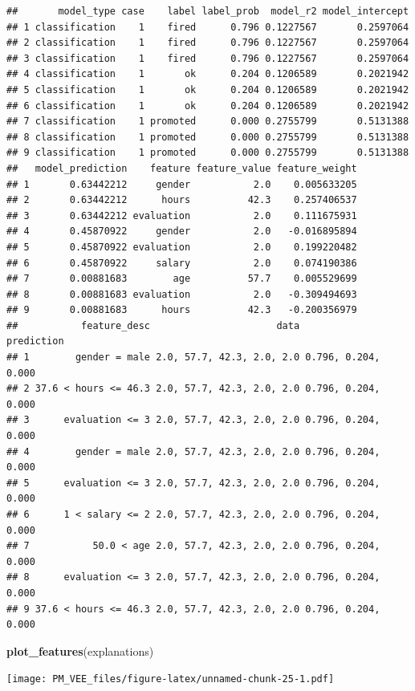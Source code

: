 \documentclass[]{krantz}
\newenvironment{Shaded}{\begin{snugshade}}{\end{snugshade}}
\newcommand{\KeywordTok}[1]{\textcolor[rgb]{0.13,0.29,0.53}{\textbf{#1}}}
\newcommand{\NormalTok}[1]{#1}
\theoremstyle{definition}
\theoremstyle{definition}
\theoremstyle{definition}
\theoremstyle{remark}
\begin{document}
\begin{verbatim}
##       model_type case    label label_prob  model_r2 model_intercept
## 1 classification    1    fired      0.796 0.1227567       0.2597064
## 2 classification    1    fired      0.796 0.1227567       0.2597064
## 3 classification    1    fired      0.796 0.1227567       0.2597064
## 4 classification    1       ok      0.204 0.1206589       0.2021942
## 5 classification    1       ok      0.204 0.1206589       0.2021942
## 6 classification    1       ok      0.204 0.1206589       0.2021942
## 7 classification    1 promoted      0.000 0.2755799       0.5131388
## 8 classification    1 promoted      0.000 0.2755799       0.5131388
## 9 classification    1 promoted      0.000 0.2755799       0.5131388
##   model_prediction    feature feature_value feature_weight
## 1       0.63442212     gender           2.0    0.005633205
## 2       0.63442212      hours          42.3    0.257406537
## 3       0.63442212 evaluation           2.0    0.111675931
## 4       0.45870922     gender           2.0   -0.016895894
## 5       0.45870922 evaluation           2.0    0.199220482
## 6       0.45870922     salary           2.0    0.074190386
## 7       0.00881683        age          57.7    0.005529699
## 8       0.00881683 evaluation           2.0   -0.309494693
## 9       0.00881683      hours          42.3   -0.200356979
##           feature_desc                      data          prediction
## 1        gender = male 2.0, 57.7, 42.3, 2.0, 2.0 0.796, 0.204, 0.000
## 2 37.6 < hours <= 46.3 2.0, 57.7, 42.3, 2.0, 2.0 0.796, 0.204, 0.000
## 3      evaluation <= 3 2.0, 57.7, 42.3, 2.0, 2.0 0.796, 0.204, 0.000
## 4        gender = male 2.0, 57.7, 42.3, 2.0, 2.0 0.796, 0.204, 0.000
## 5      evaluation <= 3 2.0, 57.7, 42.3, 2.0, 2.0 0.796, 0.204, 0.000
## 6      1 < salary <= 2 2.0, 57.7, 42.3, 2.0, 2.0 0.796, 0.204, 0.000
## 7           50.0 < age 2.0, 57.7, 42.3, 2.0, 2.0 0.796, 0.204, 0.000
## 8      evaluation <= 3 2.0, 57.7, 42.3, 2.0, 2.0 0.796, 0.204, 0.000
## 9 37.6 < hours <= 46.3 2.0, 57.7, 42.3, 2.0, 2.0 0.796, 0.204, 0.000
\end{verbatim}

\begin{Shaded}
\begin{Highlighting}[]
\KeywordTok{plot_features}\NormalTok{(explanations)}
\end{Highlighting}
\end{Shaded}

\texttt{[image: PM\_VEE\_files/figure-latex/unnamed-chunk-25-1.pdf]}
\end{document}
